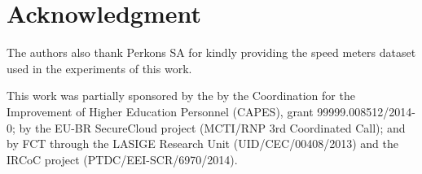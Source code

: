 \documentclass[journal]{IEEEtran}
\begin{document}

\section*{Acknowledgment}
The authors also thank Perkons SA for kindly providing the speed meters dataset used in the experiments of this work.

This work was partially sponsored by the by the Coordination for the Improvement of Higher Education Personnel (CAPES), grant 99999.008512/2014-0; by the EU-BR SecureCloud project (MCTI/RNP 3rd Coordinated Call); and by FCT through the LASIGE Research Unit (UID/CEC/00408/2013) and the IRCoC project (PTDC/EEI-SCR/6970/2014).
\end{document}
